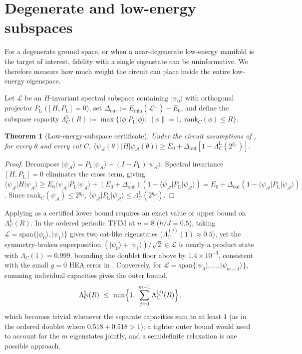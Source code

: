 \documentclass[reprint,aps,pra,floatfix,superscriptaddress,nofootinbib,longbibliography]{revtex4-2}
\newtheorem{theorem}{Theorem}
\theoremstyle{remark}
\theoremstyle{definition}
\newcommand{\calA}{\mathcal{A}}
\newcommand{\ket}[1]{\lvert #1 \rangle}
\newcommand{\bra}[1]{\langle #1 \rvert}
\newcommand{\rank}{\mathrm{rank}}
\begin{document}
\section{Degenerate and low-energy subspaces}
\label{app:degenerate}
\label{sec:degenerate}

For a degenerate ground space, or when a near-degenerate low-energy manifold is
the target of interest, fidelity with a single eigenstate can be
uninformative. We therefore measure how much weight the circuit can place inside
the entire low-energy eigenspace.

Let $\mathcal{L}$ be an $H$-invariant spectral subspace containing $\ket{\psi_0}$
with orthogonal projector $P_{\mathrm{L}}$ ($[H,P_{\mathrm{L}}]=0$), set
$\Delta_{\mathrm{out}}:=E_{\min}(\mathcal{L}^\perp)-E_0$, and define the
subspace capacity
$\Lambda_C^{\mathrm{L}}(R):=\max\{\bra{\phi}P_{\mathrm{L}}\ket{\phi}:\|\phi\|=1,\ \rank_C(\phi)\le R\}$.

\begin{theorem}[Low-energy-subspace certificate]
\label{thm:degenerate}
Under the circuit assumptions of , for every $\theta$ and every
cut $C$,
$\bra{\psi_\calA(\theta)}H\ket{\psi_\calA(\theta)}\ge E_0+\Delta_{\mathrm{out}}[1-\Lambda_C^{\mathrm{L}}(2^{g_C})]$.
\end{theorem}

\begin{proof}
Decompose $\ket{\psi_\calA}=P_{\mathrm{L}}\ket{\psi_\calA}+(I-P_{\mathrm{L}})\ket{\psi_\calA}$.
Spectral invariance $[H,P_{\mathrm{L}}]=0$ eliminates the cross term, giving
$\bra{\psi_\calA}H\ket{\psi_\calA}\ge E_0\bra{\psi_\calA}P_{\mathrm{L}}\ket{\psi_\calA}+(E_0+\Delta_{\mathrm{out}})(1-\bra{\psi_\calA}P_{\mathrm{L}}\ket{\psi_\calA})=E_0+\Delta_{\mathrm{out}}(1-\bra{\psi_\calA}P_{\mathrm{L}}\ket{\psi_\calA})$.
Since $\rank_C(\psi_\calA)\le2^{g_C}$, $\bra{\psi_\calA}P_{\mathrm{L}}\ket{\psi_\calA}\le\Lambda_C^{\mathrm{L}}(2^{g_C})$.
\end{proof}

Applying  as a certified lower bound requires an exact value
or upper bound on $\Lambda_C^{\mathrm{L}}(R)$. In the ordered periodic TFIM at
$n=8$ ($h/J=0.5$), taking $\mathcal{L}=\mathrm{span}\{\ket{\psi_0},\ket{\psi_1}\}$
gives two cat-like eigenstates ($\Lambda_C^{(j)}(1)\approx0.5$), yet the
symmetry-broken superposition $(\ket{\psi_0}+\ket{\psi_1})/\sqrt{2}\in\mathcal{L}$
is nearly a product state with $\Lambda_C(1)=0.999$, bounding the doublet floor
above by $1.4\times10^{-3}$, consistent with the small $g=0$ HEA error in
. Conversely, for
$\mathcal{L}=\mathrm{span}\{\ket{\psi_0},\dots,\ket{\psi_{m-1}}\}$, summing
individual capacities gives the outer bound,
\begin{equation}
  \label{eq:LamLub}
  \Lambda_C^{\mathrm{L}}(R)\ \le\ \min\Bigl\{1,\ \sum_{j=0}^{m-1}\Lambda_C^{(j)}(R)\Bigr\},
\end{equation}
which becomes trivial whenever the separate capacities sum to at least $1$ (as in
the ordered doublet where $0.518+0.518>1$); a tighter outer bound would need to account for the $m$ eigenstates jointly, and
a semidefinite relaxation is one possible approach.
\end{document}
